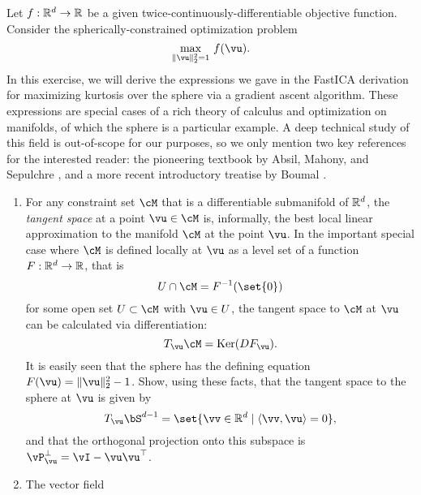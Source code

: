 \documentclass[\toplevelprefix/book-main.tex]{subfiles}
\begin{document}
\begin{exercise}\label{exercise:sphere-calculus}
    Let $f : \mathbb{R}^d \to \mathbb{R}$ be a given twice-continuously-differentiable objective function. Consider the spherically-constrained optimization problem
    \begin{equation}\label{eq:exercise-sphere-constrained-max}
        \max_{\norm{\vu}_2^2 = 1}\, f(\vu). 
    \end{equation}
    In this exercise, we will derive the expressions we gave in the FastICA derivation for maximizing kurtosis over the sphere via a gradient ascent algorithm.
    These expressions are special cases of a rich theory of calculus and optimization on manifolds, of which the sphere is a particular example. A deep technical study of this field is out-of-scope for our purposes, so we only mention two key references for the interested reader: the pioneering textbook by Absil, Mahony, and Sepulchre
    \cite{Absil2009-nc}, and a more recent introductory treatise by Boumal \cite{Boumal2023-rj}. 
    \begin{enumerate}
        \item For any constraint set $\cM$ that is a differentiable submanifold of $\mathbb{R}^d$, the 
        \textit{tangent space} at a point $\vu \in \cM$ is, informally, the best local linear approximation to the manifold $\cM$ at the point $\vu$.
        In the important special case where $\cM$ is defined locally at $\vu$ as a level set of a function $F : \mathbb{R}^d \to \mathbb{R}$,
        that is
        \begin{equation*}
            U \cap \cM = F^{-1}(\set{0})
        \end{equation*}
        for some open set $U \subset \cM$ with $\vu \in U$,
        the tangent space to $\cM$ at $\vu$ can be calculated 
        via differentiation:
        \begin{equation*}
            T_{\vu} \cM = \Ker(DF_{\vu}).
        \end{equation*}
        It is easily seen that the sphere has the defining equation $F(\vu) = \norm{\vu}_2^2 - 1$.
        Show, using these facts, that the tangent space to the sphere at $\vu$ is given by
        \begin{equation*}
            T_{\vu} \bS^{d-1} = \set{\vv \in \R^d \given \ip{\vv}{\vu} = 0},
        \end{equation*}
        and that the orthogonal projection onto this subspace is $\vP_{\vu}^\perp = \vI - \vu\vu^\top$.
        \item The vector field 
        \begin{equation}\label{eq:exercise-riemann-grad-sphere}

\end{equation}
\end{enumerate}
\end{exercise}
\end{document}
